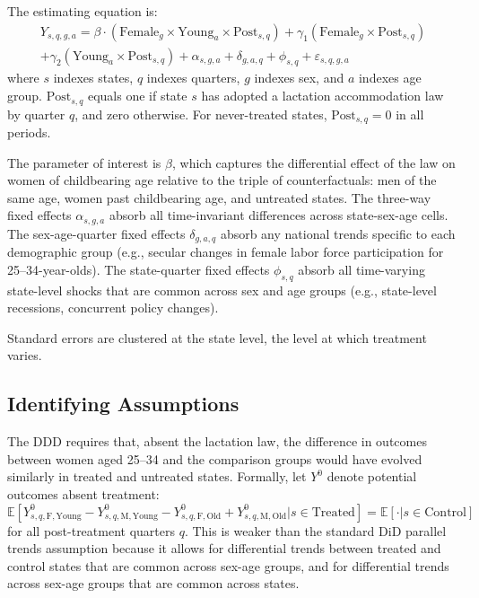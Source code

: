 \documentclass[12pt]{article}
\newcommand{\E}{\mathbb{E}}
\begin{document}
The estimating equation is:
\begin{multline}
Y_{s,q,g,a} = \beta \cdot (\text{Female}_{g} \times \text{Young}_{a} \times \text{Post}_{s,q}) + \gamma_1 (\text{Female}_{g} \times \text{Post}_{s,q}) \\
+ \gamma_2 (\text{Young}_{a} \times \text{Post}_{s,q}) + \alpha_{s,g,a} + \delta_{g,a,q} + \phi_{s,q} + \varepsilon_{s,q,g,a}
\label{eq:ddd}
\end{multline}
where $s$ indexes states, $q$ indexes quarters, $g$ indexes sex, and $a$ indexes age group. $\text{Post}_{s,q}$ equals one if state $s$ has adopted a lactation accommodation law by quarter $q$, and zero otherwise. For never-treated states, $\text{Post}_{s,q} = 0$ in all periods.

The parameter of interest is $\beta$, which captures the differential effect of the law on women of childbearing age relative to the triple of counterfactuals: men of the same age, women past childbearing age, and untreated states. The three-way fixed effects $\alpha_{s,g,a}$ absorb all time-invariant differences across state-sex-age cells. The sex-age-quarter fixed effects $\delta_{g,a,q}$ absorb any national trends specific to each demographic group (e.g., secular changes in female labor force participation for 25--34-year-olds). The state-quarter fixed effects $\phi_{s,q}$ absorb all time-varying state-level shocks that are common across sex and age groups (e.g., state-level recessions, concurrent policy changes).

Standard errors are clustered at the state level, the level at which treatment varies.

\subsection{Identifying Assumptions}

The DDD requires that, absent the lactation law, the difference in outcomes between women aged 25--34 and the comparison groups would have evolved similarly in treated and untreated states. Formally, let $Y^0$ denote potential outcomes absent treatment:
\begin{equation}
\E[Y^0_{s,q,\text{F},\text{Young}} - Y^0_{s,q,\text{M},\text{Young}} - Y^0_{s,q,\text{F},\text{Old}} + Y^0_{s,q,\text{M},\text{Old}} | s \in \text{Treated}] = \E[\cdot | s \in \text{Control}]
\end{equation}
for all post-treatment quarters $q$. This is weaker than the standard DiD parallel trends assumption because it allows for differential trends between treated and control states that are common across sex-age groups, and for differential trends across sex-age groups that are common across states.
\end{document}
